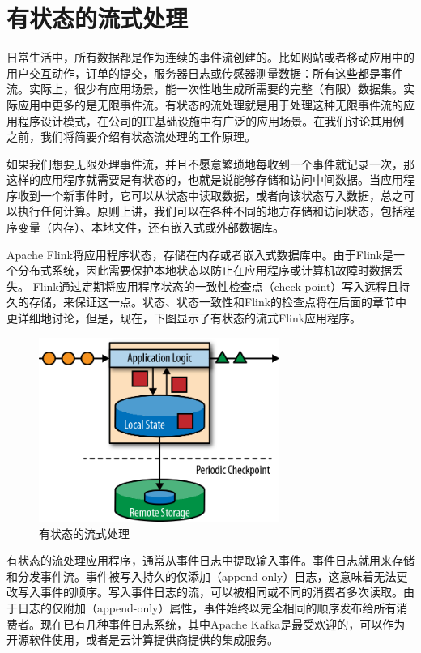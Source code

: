 \documentclass[cn,11pt,chinese]{elegantbook}
\begin{document}
\section{有状态的流式处理}

日常生活中，所有数据都是作为连续的事件流创建的。比如网站或者移动应用中的用户交互动作，订单的提交，服务器日志或传感器测量数据：所有这些都是事件流。实际上，很少有应用场景，能一次性地生成所需要的完整（有限）数据集。实际应用中更多的是无限事件流。有状态的流处理就是用于处理这种无限事件流的应用程序设计模式，在公司的IT基础设施中有广泛的应用场景。在我们讨论其用例之前，我们将简要介绍有状态流处理的工作原理。

如果我们想要无限处理事件流，并且不愿意繁琐地每收到一个事件就记录一次，那这样的应用程序就需要是有状态的，也就是说能够存储和访问中间数据。当应用程序收到一个新事件时，它可以从状态中读取数据，或者向该状态写入数据，总之可以执行任何计算。原则上讲，我们可以在各种不同的地方存储和访问状态，包括程序变量（内存）、本地文件，还有嵌入式或外部数据库。

Apache Flink将应用程序状态，存储在内存或者嵌入式数据库中。由于Flink是一个分布式系统，因此需要保护本地状态以防止在应用程序或计算机故障时数据丢失。 Flink通过定期将应用程序状态的一致性检查点（check point）写入远程且持久的存储，来保证这一点。状态、状态一致性和Flink的检查点将在后面的章节中更详细地讨论，但是，现在，下图显示了有状态的流式Flink应用程序。

\begin{figure}[htbp]
  \centering
  \includegraphics[width=0.7\textwidth]{images/spaf_0104.png}
  \caption{有状态的流式处理}
\end{figure}

有状态的流处理应用程序，通常从事件日志中提取输入事件。事件日志就用来存储和分发事件流。事件被写入持久的仅添加（append-only）日志，这意味着无法更改写入事件的顺序。写入事件日志的流，可以被相同或不同的消费者多次读取。由于日志的仅附加（append-only）属性，事件始终以完全相同的顺序发布给所有消费者。现在已有几种事件日志系统，其中Apache Kafka是最受欢迎的，可以作为开源软件使用，或者是云计算提供商提供的集成服务。
\end{document}
